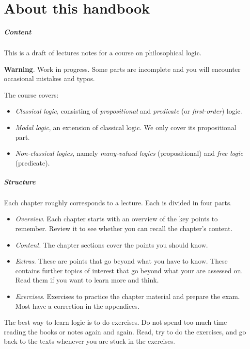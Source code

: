 \chapter*{About this handbook}

\paragraph{Content}

This is a draft of lectures notes for a course on philosophical logic.

\textbf{Warning}. Work in progress. Some parts are incomplete and you will encounter occasional mistakes and typos.

The course covers:

\begin{itemize}
\item \emph{Classical logic}, consisting of \emph{propositional} and 
\emph{predicate} (or \emph{first-order}) logic.
\item \emph{Modal logic}, an extension of classical logic. We only cover its 
propositional part.
\item \emph{Non-classical logics}, namely \emph{many-valued logics} (propositional) and \emph{free logic} (predicate).
\end{itemize}

\paragraph{Structure}

Each chapter roughly corresponds to a lecture. Each is divided in
four parts.
\begin{itemize}
\item \emph{Overview}. Each chapter starts with an overview of the key points
to remember. Review it to see whether you can recall the chapter's
content.
\item \emph{Content}. The chapter sections cover the points you should know. 
\item \emph{Extras}. These are points that go beyond what you have to know.
These contains further topics of interest that go beyond what your
are assessed on. Read them if you want to learn more and think.
\item \emph{Exercises}. Exercises to practice the chapter material and prepare
the exam. Most have a correction in the appendices.
\end{itemize}

The best way to learn logic is to do exercises. Do not spend too much
time reading the books or notes again and again. Read, try to do the
exercises, and go back to the texts whenever you are stuck in the
exercises.

